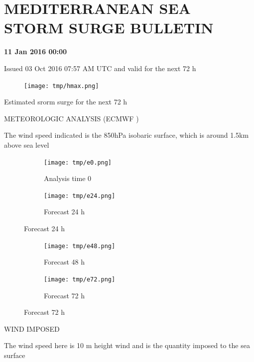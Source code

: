 \documentclass[a4paper]{article}
\renewcommand{\\}{\ {\large\textperiodcentered}\ }
\renewcommand{\\}{\ {\large\textperiodcentered}\ }
\begin{document}
\section*{MEDITERRANEAN SEA STORM SURGE BULLETIN}

\centerline{\textbf{11 Jan 2016 00:00}}

\centerline{Issued 03 Oct 2016 07:57 AM UTC and valid for the next 72 h}


\begin{figure}[h]
\centering
  \texttt{[image: tmp/hmax.png]}
\end{figure}


\centerline{Estimated srorm surge for the next 72 h}

\newpage

METEOROLOGIC ANALYSIS (ECMWF )

The wind speed indicated is the 850hPa isobaric surface, which is around 1.5km above sea level

\begin{figure}[h]
\centering
\begin{subfigure}{.5\textwidth}
  \centering
  \texttt{[image: tmp/e0.png]}
  \caption*{Analysis time 0}
  \label{fig:sub1}
\end{subfigure}%
\begin{subfigure}{.5\textwidth}
  \centering
  \texttt{[image: tmp/e24.png]}
  \caption*{Forecast 24 h}
  \label{fig:sub2}
\end{subfigure}
\label{fig:test}

\end{figure}


\begin{figure}[h]
\centering
\begin{subfigure}{.5\textwidth}
  \centering
  \texttt{[image: tmp/e48.png]}
  \caption*{Forecast 48 h}
  \label{fig:sub1}
\end{subfigure}%
\begin{subfigure}{.5\textwidth}
  \centering
  \texttt{[image: tmp/e72.png]}
  \caption*{Forecast 72 h}
  \label{fig:sub2}
\end{subfigure}
\label{fig:test}

\end{figure}

\newpage

WIND IMPOSED 

The wind speed here is 10 m height wind and is the quantity imposed to the sea surface
\end{document}
